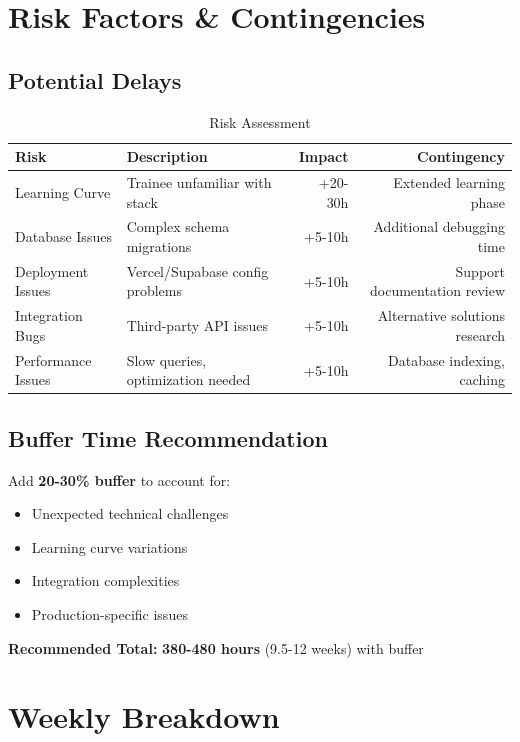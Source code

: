 \documentclass[11pt,a4paper]{article}
\begin{document}
\newpage

\section{Risk Factors \& Contingencies}

\subsection{Potential Delays}
\begin{table}[h]
\centering
\begin{tabular}{lp{8cm}rr}
\toprule
\textbf{Risk} & \textbf{Description} & \textbf{Impact} & \textbf{Contingency} \\
\midrule
Learning Curve & Trainee unfamiliar with stack & +20-30h & Extended learning phase \\
Database Issues & Complex schema migrations & +5-10h & Additional debugging time \\
Deployment Issues & Vercel/Supabase config problems & +5-10h & Support documentation review \\
Integration Bugs & Third-party API issues & +5-10h & Alternative solutions research \\
Performance Issues & Slow queries, optimization needed & +5-10h & Database indexing, caching \\
\bottomrule
\end{tabular}
\caption{Risk Assessment}
\end{table}

\subsection{Buffer Time Recommendation}
Add \textbf{20-30\% buffer} to account for:
\begin{itemize}
    \item Unexpected technical challenges
    \item Learning curve variations
    \item Integration complexities
    \item Production-specific issues
\end{itemize}

\textbf{Recommended Total:} \textbf{380-480 hours} (9.5-12 weeks) with buffer

\newpage

\section{Weekly Breakdown}
\end{document}
